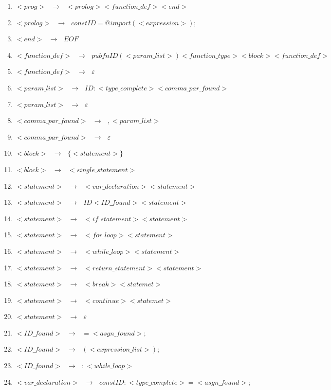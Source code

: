 \documentclass[12pt]{article}
\begin{document}
\begin{enumerate}
\item $<prog>\text{ }\to \text{ }<prolog> <function\_def> <end>$
\item $<prolog> \text{ }\to \text{ } const ID = @import ( <expression> ) ;$
\item $<end> \text{ }\to \text{ } EOF$
\item $<function\_def> \text{ }\to \text{ } pub fn ID (<param\_list>) <function\_type> <block> <function\_def>$
\item $<function\_def> \text{ }\to \text{ } \varepsilon$
\item $<param\_list> \text{ }\to \text{ } ID : <type\_complete> <comma\_par\_found>$
\item $<param\_list> \text{ }\to \text{ } \varepsilon$
\item $<comma\_par\_found> \text{ }\to \text{ } , <param\_list>$
\item $<comma\_par\_found> \text{ }\to \text{ } \varepsilon$
\item $<block> \text{ }\to \text{ } \{ <statement> \}$
\item $<block> \text{ }\to \text{ } <single\_statement>$
\item $<statement> \text{ }\to \text{ } <var\_declaration> <statement>$
\item $<statement> \text{ }\to \text{ } ID <ID\_found> <statement>$
\item $<statement> \text{ }\to \text{ } <if\_statement> <statement>$
\item $<statement> \text{ }\to \text{ } <for\_loop> <statement>$
\item $<statement> \text{ }\to \text{ } <while\_loop> <statement> $
\item $<statement> \text{ }\to \text{ } <return\_statement> <statement>$
\item $<statement> \text{ }\to \text{ } <break> <statemet>$
\item $<statement> \text{ }\to \text{ } <continue> <statemet>$
\item $<statement> \text{ }\to \text{ } \varepsilon$
\item $<ID\_found> \text{ }\to \text{ } = <asgn\_found> ;$
\item $<ID\_found> \text{ }\to \text{ } ( <expression\_list> );$
\item $<ID\_found> \text{ }\to \text{ } : <while\_loop>$
\item $<var\_declaration> \text{ }\to \text{ } const ID : <type\_complete> = <asgn\_found> ;$

\end{enumerate}
\end{document}
